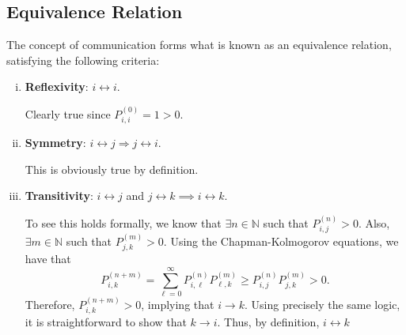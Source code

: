 \subsection*{Equivalence Relation}
\begin{Regular}
    The concept of communication forms what is known as an equivalence relation, satisfying the
    following criteria:
    \begin{enumerate}[(i)]
        \item \textbf{Reflexivity}: $i \leftrightarrow i $.

              Clearly true since $P_{i, i}^{(0)}=1>0$.
        \item \textbf{Symmetry}: $i \leftrightarrow j \Longrightarrow j \leftrightarrow i$.

              This is obviously true by definition.

        \item \textbf{Transitivity}: $i \leftrightarrow j$ and $j \leftrightarrow k \implies i \leftrightarrow k$.

              To see this holds formally, we know that $\exists n \in \mathbb{N}$ such that $P_{i, j}^{(n)}>0$. Also, $\exists m \in \mathbb{N}$ such that $P_{j, k}^{(m)}>0$. Using the Chapman-Kolmogorov equations, we have that
              \[
                  P_{i, k}^{(n+m)}=\sum_{\ell=0}^{\infty} P_{i, \ell}^{(n)} P_{\ell, k}^{(m)} \geq P_{i, j}^{(n)} P_{j, k}^{(m)}>0.
              \]
              Therefore, $P_{i, k}^{(n+m)}>0$, implying that $i \rightarrow k$. Using precisely the same logic, it is straightforward to show that $k \rightarrow i$. Thus, by definition, $i \leftrightarrow k$
    \end{enumerate}
\end{Regular}
